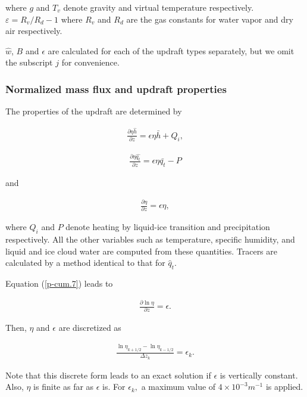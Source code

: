 where \(g\) and \(T_v\) denote gravity and virtual temperature
respectively. \(\varepsilon = R_v/R_d - 1\) where \(R_v\) and \(R_d\)
are the gas constants for water vapor and dry air respectively.

\(\hat{w}\), \(B\) and \(\epsilon\) are calculated for each of the
updraft types separately, but we omit the subscript \(j\) for
convenience.

\hypertarget{normalized-mass-flux-and-updraft-properties}{%
\subsubsection{Normalized mass flux and updraft
properties}\label{normalized-mass-flux-and-updraft-properties}}

The properties of the updraft are determined by

\begin{eqnarray}
 \frac{\partial \eta \hat{h}}{\partial z} = \epsilon \eta \bar{h} + Q_i, \label{p-cum.5}
\end{eqnarray}

\begin{eqnarray}
 \frac{\partial \eta \hat{q_t}}{\partial z} = \epsilon \eta \bar{q_t} - P \label{p-cum.6}
\end{eqnarray}

and

\begin{eqnarray}
 \frac{\partial \eta}{\partial z} = \epsilon \eta, \label{p-cum.7}
\end{eqnarray}

where \(Q_i\) and \(P\) denote heating by liquid-ice transition and
precipitation respectively. All the other variables such as temperature,
specific humidity, and liquid and ice cloud water are computed from
these quantities. Tracers are calculated by a method identical to that
for \(\hat{q}_t\).

Equation (\ref{p-cum.7}) leads to

\begin{eqnarray}
 \frac{\partial \ln \eta}{\partial z} = \epsilon.
\end{eqnarray}

Then, \(\eta\) and \(\epsilon\) are discretized as

\begin{eqnarray}
 \frac{\ln \eta_{k+1/2} - \ln \eta_{k-1/2}}{\Delta z_k} = \epsilon_k. \label{p-cum.A1}
\end{eqnarray}

Note that this discrete form leads to an exact solution if \(\epsilon\)
is vertically constant. Also, \(\eta\) is finite as far as \(\epsilon\)
is. For \(\epsilon_k,\) a maximum value of \(4 \times 10^{-3} m^{-1}\)
is applied.

